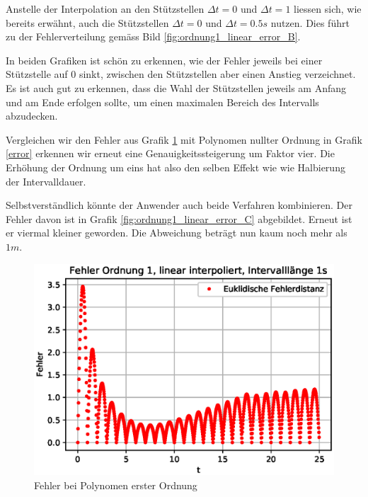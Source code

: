 Anstelle der Interpolation an den Stützstellen $\Delta t = 0$ und $\Delta t = 1$ liessen sich, wie bereits erwähnt, auch die Stützstellen $\Delta t = 0$ und $\Delta t = 0.5s$ nutzen.
Dies führt zu der Fehlerverteilung gemäss Bild \ref{fig:ordnung1_linear_error_B}.

In beiden Grafiken ist schön zu erkennen, wie der Fehler jeweils bei einer Stützstelle auf $0$ sinkt, zwischen den Stützstellen aber einen Anstieg verzeichnet.
Es ist auch gut zu erkennen, dass die Wahl der Stützstellen jeweils am Anfang und am Ende erfolgen sollte, um einen maximalen Bereich des Intervalls abzudecken.

Vergleichen wir den Fehler aus Grafik \ref{fig:ordnung1_linear_error_A} mit Polynomen nullter Ordnung in Grafik \ref{error} erkennen wir erneut eine Genauigkeitssteigerung um Faktor vier.
Die Erhöhung der Ordnung um eins hat also den selben Effekt wie wie Halbierung der Intervalldauer.

Selbstverständlich könnte der Anwender auch beide Verfahren kombinieren.
Der Fehler davon ist in Grafik \ref{fig:ordnung1_linear_error_C} abgebildet.
Erneut ist er viermal kleiner geworden.
Die Abweichung beträgt nun kaum noch mehr als $1m$.

\begin{figure}
	\centering
	\includegraphics[scale=0.7]{papers/perturbation/bilder/perturbation_fig6.eps}
	\caption{Fehler bei Polynomen erster Ordnung}
	\label{fig:ordnung1_linear_error_A}
\end{figure}

